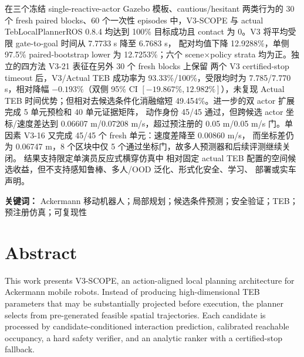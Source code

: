 \documentclass[12pt,a4paper,oneside]{report}
\begin{document}
在三个冻结 single-reactive-actor Gazebo 模板、cautious/hesitant 两类行为的 30 个 fresh
paired blocks、60 个一次性 episodes 中，V3-SCOPE 与 actual TebLocalPlannerROS 0.8.4 均达到
100\% 目标成功且 contact 为 0。V3 将平均受限 gate-to-goal 时间从 7.7733 s 降至 6.7683 s，
配对均值下降 12.9288\%，单侧 97.5\% paired-bootstrap lower 为 12.7253\%；六个
scene$\times$policy strata 均为正。独立的四方法 V3-21 表征在另外 30 个 fresh blocks 上保留
两个 V3 certified-stop timeout 后，V3/Actual TEB 成功率为 93.33\%/100\%，受限均时为
7.785/7.770 s，相对降幅 $-0.193\%$（双侧 95\% CI $[-19.867\%,12.982\%]$），未复现
Actual TEB 时间优势；但相对去候选条件化消融缩短 49.454\%。进一步的双 actor 扩展完成
5 单元预检和 40 单元证据矩阵，
动作身份 45/45 通过，但跨候选 actor 坐标/速度差达到 0.06607 m/0.07208 m/s，超过预注册的
0.05 m/0.05 m/s 门。单因素 V3-16 又完成 45/45 个 fresh 单元：速度差降至 0.00860 m/s，
而坐标差仍为 0.06747 m，8 个区块中仅 5 个通过坐标门，故多人预测器和后续评测继续关闭。
结果支持限定单演员反应式横穿仿真中
相对固定 actual TEB 配置的空间候选收益，但不支持感知鲁棒、多人/OOD 泛化、形式化安全、学习、
部署或实车声明。

\noindent\textbf{关键词：} Ackermann 移动机器人；局部规划；候选条件预测；安全验证；TEB；
预注册仿真；可复现性

\chapter*{Abstract}
This work presents V3-SCOPE, an action-aligned local planning architecture for Ackermann mobile
robots. Instead of producing high-dimensional TEB parameters that may be substantially projected
before execution, the planner selects from pre-generated feasible spatial trajectories. Each
candidate is processed by candidate-conditioned interaction prediction, calibrated reachable
occupancy, a hard safety verifier, and an analytic ranker with a certified-stop fallback.
\end{document}
